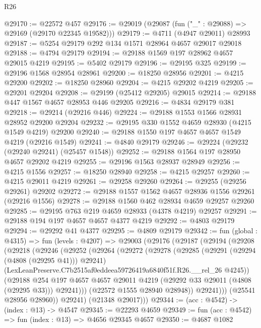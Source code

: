 \begin{lexlean}{R26}
\begin{coremodule}
@29170 := @22572 @457
@29176 := @29019 (@29087 (fun ("_" : @29088) => @29169 (@29170 @22345 @19582)))
@29179 := @4711 (@4947 @29011) @28993
@29187 := @5254 @29179 @292 @134 @1571 @28964 @4657 @29017 @29018
@29188 := @4794 @29179
@29194 := @29188 @1569 @197 @28962 @4657 @29015 @4219
@29195 := @5402 @29179
@29196 := @29195 @325
@29199 := @29196 @1568 @28954 @28961
@29200 := @18250 @28956
@29201 := @4215 @29200
@29202 := @18250 @28960
@29204 := @4215 @29202 @4219
@29205 := @29201 @29204
@29208 := @29199 (@25412 @29205) @29015
@29214 := @29188 @447 @1567 @4657 @28953 @446 @29205
@29216 := @4834 @29179 @381
@29218 := @29214 (@29216 @446)
@29224 := @29188 @1553 @1566 @28931 @28952 @29200 @29204
@29232 := @29195 @330 @1552 @4659 @28930 (@4215 @1549 @4219) @29200
@29240 := @29188 @1550 @197 @4657 @4657 @1549 @4219 (@29216 @1549)
@29241 := @4840 @29179
@29246 := @29224 (@29232 (@29240 @29241) (@25457 @1548))
@29252 := @29188 @1564 @197 @28950 @4657 @29202 @4219
@29255 := @29196 @1563 @28937 @28949
@29256 := @4215 @1556
@29257 := @18250 @28940
@29258 := @4215 @29257
@29260 := @4215 @29011 @4219
@29261 := @29258 @29260
@29264 := @29255 (@29256 @29261) @29202
@29272 := @29188 @1557 @1562 @4657 @28936 @1556 @29261 (@29216 @1556)
@29278 := @29188 @1560 @462 @28934 @4659 @29257 @29260
@29285 := @29195 @763 @219 @4659 @28933 (@4378 @4219) @29257
@29291 := @29188 @194 @197 @4657 @4657 @4377 @4219
@29292 := @4803 @29179
@29294 := @29292 @41 @4377
@29295 := @4809 @29179
@29342 := fun (global : @4315) =>
  fun (levels : @4207) =>
  @29003
    (@29176
      (@29187
        (@29194
          (@29208
            (@29218
              (@29246
                (@29252
                  (@29264
                    (@29272
                      (@29278
                        (@29285
                          (@29291 (@29294 (@4808 (@29295 @41))) @29241)
                          (LexLeanPreserve.C7b2515af0eddeea59726419a6840f51f.R26.__rel_26 @4245))
                        (@29188
                          @254
                          @197
                          @4657
                          @4657
                          @29011
                          @4219
                          (@29292 @33 @29011 (@4808 (@29295 @33)))
                          @29241)))
                    (@22572 @1555 @28940 @28948))
                  @29241)))
            (@25541 @28956 @28960))
          @29241)
        (@21348 @29017)))
@29344 := (acc : @4542) -> (index : @13) -> @4547
@29345 := @22293 @4659
@29349 := fun (acc : @4542) => fun (index : @13) => @4656 @29345 @4657
@29350 := @4687 @1082

\end{coremodule}
\end{lexlean}

